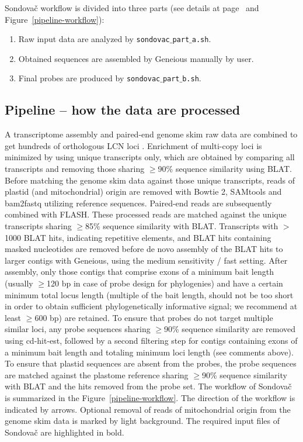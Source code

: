 \documentclass[a4paper, 11pt, twoside]{article}
\begin{document}
Sondovač workflow is divided into three parts (see details at page~\pageref{pipeline-overview} and Figure~\ref{pipeline-workflow}):

\begin{enumerate}
\item Raw input data are analyzed by \texttt{sondovac$\_$part$\_$a.sh}.
\item Obtained sequences are assembled by Geneious manually by user.
\item Final probes are produced by \texttt{sondovac$\_$part$\_$b.sh}.
\end{enumerate}

\subsection{Pipeline -- how the data are processed}

A transcriptome assembly and paired-end genome skim raw data are combined to get hundreds of orthologous LCN loci \citep{Schmickl2016}. Enrichment of multi-copy loci is minimized by using unique transcripts only, which are obtained by comparing all transcripts and removing those sharing $\geq$90\% sequence similarity using BLAT. Before matching the genome skim data against those unique transcripts, reads of plastid (and mitochondrial) origin are removed with Bowtie 2, SAMtools and bam2fastq utilizing reference sequences. Paired-end reads are subsequently combined with FLASH. These processed reads are matched against the unique transcripts sharing $\geq$85\% sequence similarity with BLAT. Transcripts with $>$1000 BLAT hits, indicating repetitive elements, and BLAT hits containing masked nucleotides are removed before de novo assembly of the BLAT hits to larger contigs with Geneious, using the medium sensitivity / fast setting. After assembly, only those contigs that comprise exons of a minimum bait length (usually $\geq$120 bp in case of probe design for phylogenies) and have a certain minimum total locus length (multiple of the bait length, should not be too short in order to obtain sufficient phylogenetically informative signal; we recommend at least $\geq$600 bp) are retained. To ensure that probes do not target multiple similar loci, any probe sequences sharing $\geq$90\% sequence similarity are removed using cd-hit-est, followed by a second filtering step for contigs containing exons of a minimum bait length and totaling minimum loci length (see comments above). To ensure that plastid sequences are absent from the probes, the probe sequences are matched against the plastome reference sharing $\geq$90\% sequence similarity with BLAT and the hits removed from the probe set. The workflow of Sondovač is summarized in the Figure~\ref{pipeline-workflow}. The direction of the workflow is indicated by arrows. Optional removal of reads of mitochondrial origin from the genome skim data is marked by light background. The required input files of Sondovač are highlighted in bold.
\end{document}
